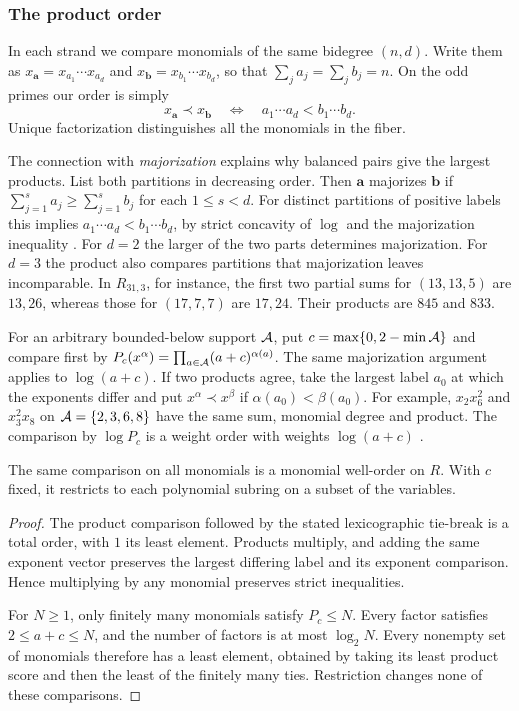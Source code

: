 \subsubsection{The product order}
In each strand we compare monomials of the same bidegree $(n,d)$.
Write them as $x_{\boldsymbol a}=x_{a_1}\cdots x_{a_d}$ and
$x_{\boldsymbol b}=x_{b_1}\cdots x_{b_d}$, so that
$\sum_j a_j=\sum_j b_j=n$. On the odd primes our order is simply
\[
 x_{\boldsymbol a}\prec x_{\boldsymbol b}
 \quad\Longleftrightarrow\quad
 a_1\cdots a_d<b_1\cdots b_d.
\]
Unique factorization distinguishes all the monomials in the fiber.

The connection with \emph{majorization} explains why balanced pairs
give the largest products. List both partitions in decreasing order.
Then $\boldsymbol a$ majorizes $\boldsymbol b$ if
$\sum_{j=1}^s a_j\ge\sum_{j=1}^s b_j$ for each $1\le s<d$.
For distinct partitions of positive labels this implies
$a_1\cdots a_d<b_1\cdots b_d$, by strict concavity of $\log$ and
the majorization inequality \cite[Ch.~3]{MOA11}.
For $d=2$ the larger of the two parts determines majorization.
For $d=3$ the product also compares partitions that majorization
leaves incomparable. In $R_{31,3}$, for instance, the first two
partial sums for $(13,13,5)$ are $13,26$, whereas those for
$(17,7,7)$ are $17,24$. Their products are $845$ and $833$.

For an arbitrary bounded-below support $\mathcal A$, put
$c=\max\{0,2-\min\mathcal A\}$ and compare first by
$P_c(x^\alpha)=\prod_{a\in\mathcal A}(a+c)^{\alpha(a)}$.
The same majorization argument applies to $\log(a+c)$.
If two products agree, take the largest label $a_0$ at which the
exponents differ and put $x^\alpha\prec x^\beta$ if
$\alpha(a_0)<\beta(a_0)$. For example, $x_2x_6^2$ and $x_3^2x_8$
on $\mathcal A=\{2,3,6,8\}$ have the same sum, monomial degree and product.
The comparison by $\log P_c$ is a weight order with weights
$\log(a+c)$ \cite[Definition~1.2 and Section~6]{Vietri02}.

\begin{proposition}\label{moves:order}
The same comparison on all monomials is a monomial well-order on $R$.
With $c$ fixed, it restricts to each polynomial subring on a subset
of the variables.
\end{proposition}
\begin{proof}
The product comparison followed by the stated lexicographic tie-break
is a total order, with $1$ its least element. Products multiply, and
adding the same exponent vector preserves the largest differing label
and its exponent comparison. Hence multiplying by any monomial
preserves strict inequalities.

For $N\ge1$, only finitely many monomials satisfy $P_c\le N$.
Every factor satisfies $2\le a+c\le N$, and the number of factors
is at most $\log_2 N$. Every nonempty set of monomials therefore has a
least element, obtained by taking its least product score and then
the least of the finitely many ties. Restriction changes none of
these comparisons.
\end{proof}

